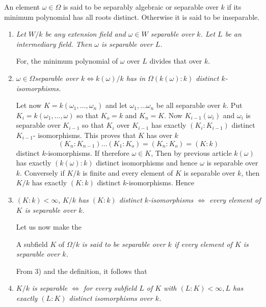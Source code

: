 \begin{defi*}%
An element $\omega \in \Omega$ is said to be separably algebraic or
separable over $k$ if its minimum polynomial has all roots
distinct. Otherwise it is said to be inseparable. 
\end{defi*}
\begin{enumerate}[1)]
\item \textit{Let $W/k$ be any extension field and $\omega \in W$
  separable over $k$. Let $L$ be an intermediary field. Then $\omega$
  is separable over $L$.} 

For, the minimum polynomial of $\omega$ over $L$ divides that over
$k$. 

\item $\omega \in \Omega $\pageoriginale \textit{separable over $k
  \Leftrightarrow k   (\omega)/k$ has in $\Omega (k (\omega) :k)$
  distinct   $k$-isomorphisms.}  

Let now $K = k (\omega_1, \ldots ,\omega_n)$ and let $\omega_1 ,
\ldots \omega_n$ be all separable over $k$. Put $K_i = k(\omega_1
,\ldots , \omega)$ so that $K_o = k$ and $K_n = K$. Now
$K_{i-1}(\omega_i)$ and $\omega_i$ is separable over $K_{i-1}$ so that
$K_i$ over $K_{i-1}$ has exactly $(K_i : K_{i-1})$ distinct $K_{i-1}$-
isomorphisms. This proves that $K$ has over $k$ 
$$
(K_n : K_{n-1}) \ldots (K_1 : K_o) = (K_n : K_o) = (K : k)
$$
distinct $k$-isomorphisms. If therefore $\omega \in K$, Then by previous
article $k(\omega)$ has exactly $(k (\omega) : k)$ distinct
isomorphisms and hence $\omega$ is separable over $k$. Conversely if
$K/k$ is finite and every element of $K$  is separable over $k$, then
$K/k$ has exactly $(K : k)$ distinct $k$-isomorphisms. Hence 

\item $(K  : k) < \infty$, $K/k$  \textit{has $( K : k)$ distinct
  $k$-isomorphisms $\Leftrightarrow$ every element of $K$ is separable
  over $k$}. 

Let us now make the 

\begin{defi*}%
A subfield $K$ of $\Omega /k$ \textit{is said to be separable over $k$
  if every element of $K$ is separable over $k$.} 
\end{defi*}

From 3) and the definition, it follows that 

\item $K/k$ \textit{is separable $\Leftrightarrow$ for every subfield
  $L$ of $K$ with $(L : K) < \infty , L$ has exactly $(L : K)$
  distinct isomorphisms over $k$.} 


\end{enumerate}
